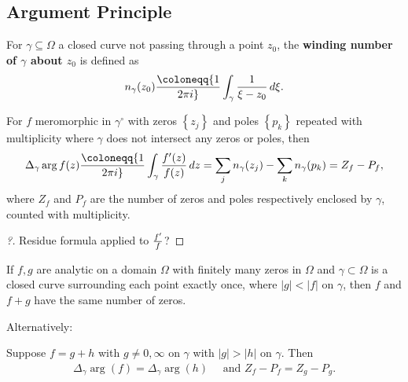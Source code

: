 \hypertarget{argument-principle}{%
\subsection{Argument Principle}\label{argument-principle}}

\begin{definition}

For \(\gamma \subseteq \Omega\) a closed curve not passing through a
point \(z_0\), the \textbf{winding number of \(\gamma\) about \(z_0\)}
is defined as
\begin{align*}
n_\gamma(z_0) \coloneqq{1\over 2\pi i} \int_\gamma {1\over \xi -z_0}\,d\xi
.\end{align*}

\end{definition}

\begin{theorem}

For \(f\) meromorphic in \(\gamma^\circ\) with zeros
\(\left\{{ z_j }\right\}\) and poles \(\left\{{ p_k }\right\}\) repeated
with multiplicity where \(\gamma\) does not intersect any zeros or
poles, then
\begin{align*}  
\Delta_\gamma \arg f(z) \coloneqq{1\over 2\pi i} \int_\gamma {f'(z) \over f(z)} \,dz= \sum_{j} n_\gamma(z_j) - \sum_k n_\gamma(p_k) = Z_f - P_f
,\end{align*}
where \(Z_f\) and \(P_f\) are the number of zeros and poles respectively
enclosed by \(\gamma\), counted with multiplicity.

\end{theorem}

\begin{proof}[?]

Residue formula applied to \(f'\over f\)?

\end{proof}

\begin{corollary}\label{Rouche}

If \(f, g\) are analytic on a domain \(\Omega\) with finitely many zeros
in \(\Omega\) and \(\gamma \subset \Omega\) is a closed curve
surrounding each point exactly once, where
\({\left\lvert {g} \right\rvert} < {\left\lvert {f} \right\rvert}\) on
\(\gamma\), then \(f\) and \(f+g\) have the same number of zeros.

Alternatively:

Suppose \(f = g + h\) with \(g \neq 0, \infty\) on \(\gamma\) with
\({\left\lvert {g} \right\rvert} > {\left\lvert {h} \right\rvert}\) on
\(\gamma\). Then
\begin{align*}\Delta_\gamma \arg(f) = \Delta_\gamma \arg(h)\quad\text{ and } Z_f - P_f = Z_g - P_g.\end{align*}

\end{corollary}

